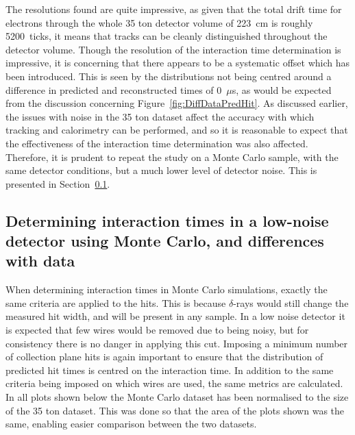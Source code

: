 The resolutions found are quite impressive, as given that the total drift time for electrons through the whole 35 ton detector volume of 223~cm is roughly 5200~ticks, it means that tracks can be cleanly distinguished throughout the detector volume. Though the resolution of the interaction time determination is impressive, it is concerning that there appears to be a systematic offset which has been introduced. This is seen by the distributions not being centred around a difference in predicted and reconstructed times of 0~$\mu$s, as would be expected from the discussion concerning Figure~\ref{fig:DiffDataPredHit}. As discussed earlier, the issues with noise in the 35 ton dataset affect the accuracy with which tracking and calorimetry can be performed, and so it is reasonable to expect that the effectiveness of the interaction time determination was also affected. Therefore, it is prudent to repeat the study on a Monte Carlo sample, with the same detector conditions, but a much lower level of detector noise. This is presented in Section~\ref{sec:MCDataComp}. \\

\subsection{Determining interaction times in a low-noise detector using Monte Carlo, and differences with data} \label{sec:MCDataComp}
When determining interaction times in Monte Carlo simulations, exactly the same criteria are applied to the hits. This is because $\delta$-rays would still change the measured hit width, and will be present in any sample. In a low noise detector it is expected that few wires would be removed due to being noisy, but for consistency there is no danger in applying this cut. Imposing a minimum number of collection plane hits is again important to ensure that the distribution of predicted hit times is centred on the interaction time. In addition to the same criteria being imposed on which wires are used, the same metrics are calculated. In all plots shown below the Monte Carlo dataset has been normalised to the size of the 35 ton dataset. This was done so that the area of the plots shown was the same, enabling easier comparison between the two datasets. \\

